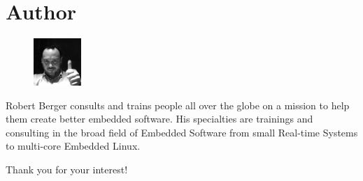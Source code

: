\documentclass[a4paper,11pt]{article}
\begin{document}
\pagebreak
 
\section{Author}
\begin{figure}
  \vspace{-35pt}
  \begin{center}
    \includegraphics[width=0.16\textwidth]{robert_berger}
  \end{center}
\end{figure}
Robert Berger consults and trains people all over the globe on a mission to help
them create better embedded software. His specialties are trainings and
consulting in the broad field of Embedded Software from small Real-time Systems
to multi-core Embedded Linux.
\linebreak

\thispagestyle{empty} %

\begin{center}
Thank you for your interest! \\
\end{center}
\end{document}
